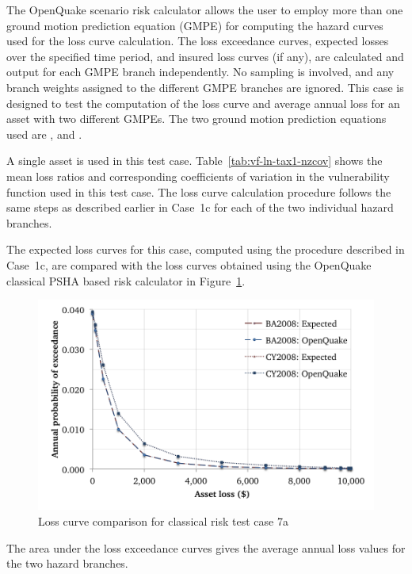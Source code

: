 The OpenQuake scenario risk calculator allows the user to employ more than one ground motion prediction equation (GMPE) for computing the hazard curves used for the loss curve calculation. The loss exceedance curves, expected losses over the specified time period, and insured loss curves (if any), are calculated and output for each GMPE branch independently. No sampling is involved, and any branch weights assigned to the different GMPE branches are ignored. This case is designed to test the computation of the loss curve and average annual loss for an asset with two different GMPEs. The two ground motion prediction equations used are \citet{boore2008}, and \citet{chiou2008}.

A single asset is used in this test case. Table~\ref{tab:vf-ln-tax1-nzcov} shows the mean loss ratios and corresponding coefficients of variation in the vulnerability function used in this test case. The loss curve calculation procedure follows the same steps as described earlier in Case~1c for each of the two individual hazard branches.

The expected loss curves for this case, computed using the procedure described in Case~1c, are compared with the loss curves obtained using the OpenQuake classical PSHA based risk calculator in Figure~\ref{fig:lc-cr-7a}.

\begin{figure}[htbp]
\centering
\includegraphics[width=12cm]{qareport/figures/fig-lc-cr-7a}
\caption{Loss curve comparison for classical risk test case 7a}
\label{fig:lc-cr-7a}
\end{figure}

The area under the loss exceedance curves gives the average annual loss values for the two hazard branches.
